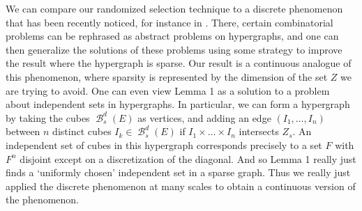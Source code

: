 \documentclass[dvipsnames,letterpaper,12pt]{article}
\numberwithin{equation}{section}
\theoremstyle{plain}
\DeclareMathOperator{\B}{\mathcal{B}}
\begin{document}
We can compare our randomized selection technique to a discrete phenomenon that has been recently noticed, for instance in \cite{BaloghMorrisSamotij}. There, certain combinatorial problems can be rephrased as abstract problems on hypergraphs, and one can then generalize the solutions of these problems using some strategy to improve the result where the hypergraph is sparse. Our result is a continuous analogue of this phenomenon, where sparsity is represented by the dimension of the set $Z$ we are trying to avoid. One can even view Lemma 1 as a solution to a problem about independent sets in hypergraphs. In particular, we can form a hypergraph by taking the cubes $\B^d_s(E)$ as vertices, and adding an edge $(I_1, \dots, I_n)$ between $n$ distinct cubes $I_k \in \B^d_s(E)$ if $I_1 \times \dots \times I_n$ intersects $Z_s$. An independent set of cubes in this hypergraph corresponds precisely to a set $F$ with $F^n$ disjoint except on a discretization of the diagonal. And so Lemma 1 really just finds a `uniformly chosen' independent set in a sparse graph. Thus we really just applied the discrete phenomenon at many scales to obtain a continuous version of the phenomenon.










\end{document}
